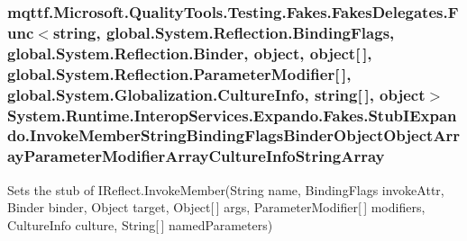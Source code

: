 \hypertarget{class_system_1_1_runtime_1_1_interop_services_1_1_expando_1_1_fakes_1_1_stub_i_expando_a6034419a145e65f90ed272ae4e96ec4c}{
\subsubsection[{Invoke\-Member\-String\-Binding\-Flags\-Binder\-Object\-Object\-Array\-Parameter\-Modifier\-Array\-Culture\-Info\-String\-Array}]{\setlength{\rightskip}{0pt plus 5cm}mqttf.\-Microsoft.\-Quality\-Tools.\-Testing.\-Fakes.\-Fakes\-Delegates.\-Func$<$string, global.\-System.\-Reflection.\-Binding\-Flags, global.\-System.\-Reflection.\-Binder, object, object\mbox{[}$\,$\mbox{]}, global.\-System.\-Reflection.\-Parameter\-Modifier\mbox{[}$\,$\mbox{]}, global.\-System.\-Globalization.\-Culture\-Info, string\mbox{[}$\,$\mbox{]}, object$>$ System.\-Runtime.\-Interop\-Services.\-Expando.\-Fakes.\-Stub\-I\-Expando.\-Invoke\-Member\-String\-Binding\-Flags\-Binder\-Object\-Object\-Array\-Parameter\-Modifier\-Array\-Culture\-Info\-String\-Array}}\label{class_system_1_1_runtime_1_1_interop_services_1_1_expando_1_1_fakes_1_1_stub_i_expando_a6034419a145e65f90ed272ae4e96ec4c}


Sets the stub of I\-Reflect.\-Invoke\-Member(\-String name, Binding\-Flags invoke\-Attr, Binder binder, Object target, Object\mbox{[}$\,$\mbox{]} args, Parameter\-Modifier\mbox{[}$\,$\mbox{]} modifiers, Culture\-Info culture, String\mbox{[}$\,$\mbox{]} named\-Parameters)

